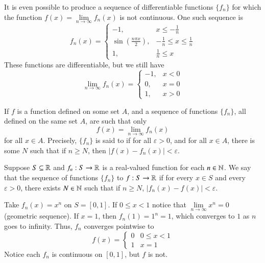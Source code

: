 \begin{example}
    It is even possible to produce a sequence of differentiable functions $\{f_n\}$ for which the function $f(x) = \lim\limits_{n\rightarrow \infty}f_n(x)$ is not continuous. One such sequence is \begin{equation*}
        f_n(x) = \left\{\begin{array}{lc} -1, &  x \leq -\frac{1}{n} \\ \sin\left(\frac{n\pi x}{2}\right), & -\frac{1}{n} \leq x \leq \frac{1}{n} \\ 1, & \frac{1}{n} \leq x \end{array}\right.
    \end{equation*}
    These functions are differentiable, but we still have  \begin{equation*}
        \lim\limits_{n\rightarrow \infty}f_n(x) = \left\{\begin{array}{lc} -1, & x < 0 \\ 0, & x = 0 \\ 1, & x > 0 \end{array}\right.
    \end{equation*}
\end{example}

\begin{definition}
    If $f$ is a function defined on some set $A$, and a sequence of functions $\{f_n\}$, all defined on the same set $A$, are such that only \begin{equation*}
        f(x) = \lim\limits_{n\rightarrow \infty}f_n(x)
    \end{equation*}
    for all $x \in A$. Precisely, $\{f_n\}$ is said to  if for all $\varepsilon > 0$, and for all $x \in A$, there is some $N$ such that if $n \geq N$, then $|f(x) - f_n(x)| < \varepsilon$.
\end{definition}

\begin{definition}
    Suppose $S \subseteq \mathbb R$ and $f_n:S\rightarrow \mathbb R$ is a real-valued function for each $n \in \mathbb N$. We say that the sequence of functions $\{f_n\}$  to $f:S\rightarrow \mathbb R$ if for every $x \in S$ and every $\varepsilon > 0$, there exists $N \in \mathbb N$ such that if $n \geq N$, $|f_n(x) - f(x)| < \varepsilon$.
\end{definition}

\begin{example}
    Take $f_n(x) = x^n$ on $S = [0,1]$. If $0 \leq x < 1$ notice that $\lim\limits_{n\rightarrow \infty}x^n = 0$ (geometric sequence). If $x = 1$, then $f_n(1) = 1^n = 1$, which converges to $1$ as $n$ goes to infinity. Thus, $f_n$ converges pointwise to \begin{equation*}
        f(x) = \left\{\begin{array}{lc} 0 & 0 \leq x < 1 \\ 1 & x = 1\end{array}\right.
    \end{equation*}
    Notice each $f_n$ is continuous on $[0,1]$, but $f$ is not.
\end{example}

